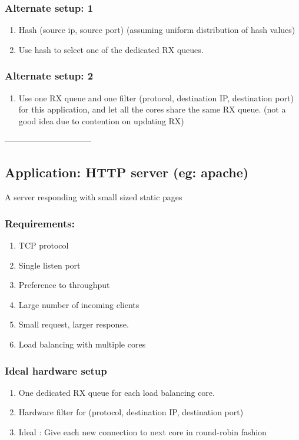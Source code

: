 \subsubsection{Alternate setup: 1}
\begin{enumerate}
       \item Hash (source ip, source port) (assuming uniform distribution of hash values)
       \item Use hash to select one of the dedicated RX queues.
\end{enumerate}

\subsubsection{Alternate setup: 2}
\begin{enumerate}
       \item Use one RX queue and one filter (protocol, destination IP,
        destination port) for this application, and let all the cores
        share the same RX queue.
        (not a good idea due to contention on updating RX)
\end{enumerate}

--------------------------------
\subsection{Application:  HTTP server (eg: apache)}
A server responding with small sized static pages
\subsubsection{Requirements:}
\begin{enumerate}
    \item TCP protocol
    \item Single listen port
    \item Preference to throughput
    \item Large number of incoming clients
    \item Small request, larger response.
    \item Load balancing with multiple cores
\end{enumerate}

\subsubsection{Ideal hardware setup}
\begin{enumerate}
    \item One dedicated RX queue for each load balancing core.
    \item Hardware filter for (protocol, destination IP, destination port)
    \item Ideal : Give each new connection to next core in round-robin fashion
\end{enumerate}

